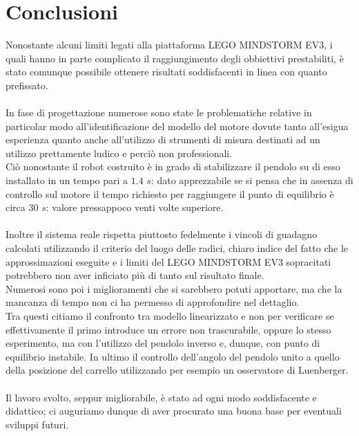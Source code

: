 \chapter{Conclusioni}
Nonostante alcuni limiti legati alla piattaforma LEGO MINDSTORM EV3, i quali hanno in parte complicato il raggiungimento degli obbiettivi prestabiliti, è stato comunque possibile ottenere risultati soddisfacenti in linea con quanto prefissato.\\\\
In fase di progettazione numerose sono state le problematiche relative in particolar modo all'identificazione del modello del motore dovute tanto all'esigua esperienza quanto anche all'utilizzo di strumenti di misura destinati ad un utilizzo prettamente ludico e perciò non professionali.\\
Ciò nonostante il robot costruito è in grado di stabilizzare il pendolo su di esso installato in un tempo pari a $1.4$ $s$: dato apprezzabile se si pensa che in assenza di controllo sul motore il tempo richiesto per raggiungere il punto di equilibrio è circa $30$ $s$: valore pressappoco venti volte superiore.\\\\
Inoltre il sistema reale rispetta piuttosto fedelmente i vincoli di guadagno calcolati utilizzando il criterio del luogo delle radici, chiaro indice del fatto che le approssimazioni eseguite e i limiti del LEGO MINDSTORM EV3 sopracitati potrebbero non aver inficiato più di tanto sul risultato finale.\\
Numerosi sono poi i miglioramenti che si sarebbero potuti apportare, ma che la mancanza di tempo non ci ha permesso di approfondire nel dettaglio.\\
Tra questi citiamo il confronto tra modello linearizzato e non per verificare se effettivamente il primo introduce un errore non trascurabile, oppure lo stesso esperimento, ma con l'utilizzo del pendolo inverso e, dunque, con punto di equilibrio instabile. In ultimo il controllo dell'angolo del pendolo unito a quello della posizione del carrello utilizzando per esempio un osservatore di Luenberger.\\\\
Il lavoro svolto, seppur migliorabile, è stato ad ogni modo soddisfacente e didattico; ci auguriamo dunque di aver procurato una buona base per eventuali sviluppi futuri.



